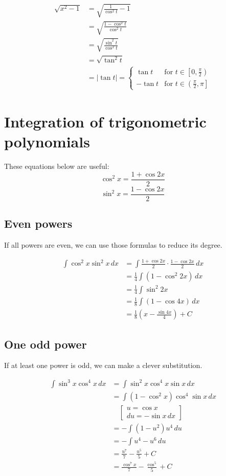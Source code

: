 \documentclass[11pt]{article}
\begin{document}
\begin{align*}
\sqrt{x^2 - 1} &= \sqrt{\frac{1}{\cos^2 t} - 1} \\
&= \sqrt{\frac{1 - \cos^2 t}{\cos^2 t}} \\
&= \sqrt{\frac{\sin^2 t}{\cos ^2 t}} \\
&= \sqrt{\tan^2 t} \\
&= |\tan t| = \begin{cases}
\tan t & \text{for } t \in \left[0, \frac{\pi}{2} \right) \\
- \tan t & \text{for } t \in \left(\frac{\pi}{2}, \pi \right]
\end{cases}
\end{align*}

\newpage

\section{Integration of trigonometric polynomials}
\label{sec:org2aba28b}
These equations below are useful:
\[\cos^2 x = \frac{1 + \cos 2x}{2}\]
\[\sin^2 x = \frac{1 - \cos 2x}{2}\]

\subsection{Even powers}
\label{sec:org23de04a}
If all powers are even, we can use those formulas to reduce its degree.

\begin{align*}
\int \cos^2 x \sin^2 x \, dx &= \int \frac{1 + \cos 2x}{2} \cdot \frac{1 - \cos 2x}{2} \, dx \\
&= \frac{1}{4} \int (1 - \cos^2 2x) \, dx \\
&= \frac{1}{4} \int \sin^2 2x \\
&= \frac{1}{8} \int (1 - \cos 4x) \, dx \\
&= \frac{1}{8} \left( x - \frac{\sin 4x}{4} \right) + C
\end{align*}

\newpage

\subsection{One odd power}
\label{sec:orga8062c7}
If at least one power is odd, we can make a clever substitution.

\begin{align*}
\int \sin^3 x \cos^4 x \, dx &= \int \sin^2 x \cos^4 x \sin x \, dx \\
&= \int (1 - \cos^2 x) \cos^4 \sin x \, dx \\
&\quad \left[ \begin{gathered} u = \cos x \\ du = - \sin x \, dx \end{gathered} \right] \\
&= - \int (1 - u^2) u^4 \, du \\
&= - \int u^4 - u^6 \, du \\
&= \frac{u^7}{7} - \frac{u^5}{5} + C \\
&= \frac{\cos^7 x}{7} - \frac{\cos^5}{5} + C
\end{align*}
\end{document}
